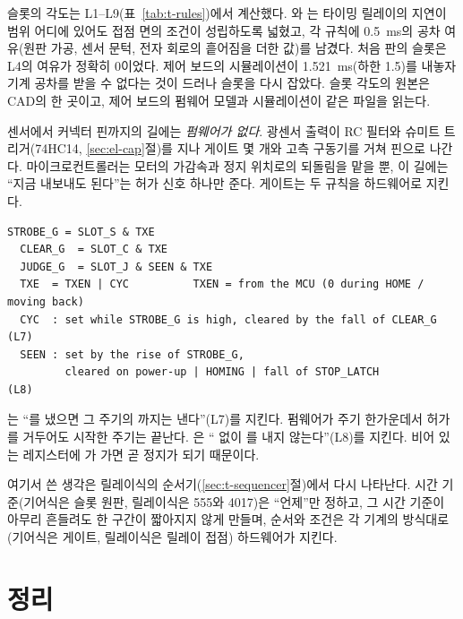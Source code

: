 \Ours 슬롯의 각도는 L1--L9(표~\ref{tab:t-rules})에서 계산했다. 와 는 타이밍 릴레이의 지연이 범위 어디에 있어도
접점 면의 조건이 성립하도록 넓혔고, 각 규칙에 0.5~ms의 공차 여유(원판 가공, 센서 문턱, 전자 회로의 흩어짐을
더한 값)를 남겼다. 처음 판의 슬롯은 L4의 여유가 정확히 0이었다. 제어 보드의 시뮬레이션이 1.521~ms(하한
1.5)를 내놓자 기계 공차를 받을 수 없다는 것이 드러나 슬롯을 다시 잡았다. 슬롯 각도의 원본은 CAD의
 한 곳이고, 제어 보드의 펌웨어 모델과 시뮬레이션이 같은 파일을 읽는다.

센서에서 커넥터 핀까지의 길에는 \emph{펌웨어가 없다}. 광센서 출력이 RC 필터와 슈미트 트리거(74HC14, \ref{sec:el-cap}절)를 지나
게이트 몇 개와 고측 구동기를 거쳐 핀으로 나간다. 마이크로컨트롤러는 모터의 가감속과 정지 위치로의 되돌림을
맡을 뿐, 이 길에는 ``지금 내보내도 된다''는 허가 신호 하나만 준다. 게이트는 두 규칙을 하드웨어로 지킨다.

\begin{lstlisting}[numbers=none,caption={기어식 제어 보드의 타이밍 경로(\code{control-board/README.md} 1.1절).},label={lst:t-gate}]
  STROBE_G = SLOT_S & TXE
  CLEAR_G  = SLOT_C & TXE
  JUDGE_G  = SLOT_J & SEEN & TXE
  TXE  = TXEN | CYC          TXEN = from the MCU (0 during HOME / moving back)
  CYC  : set while STROBE_G is high, cleared by the fall of CLEAR_G        (L7)
  SEEN : set by the rise of STROBE_G,
         cleared on power-up | HOMING | fall of STOP_LATCH                   (L8)
\end{lstlisting}

는 ``를 냈으면 그 주기의 까지는 낸다''(L7)를 지킨다. 펌웨어가 주기 한가운데서
허가를 거두어도 시작한 주기는 끝난다. 은 `` 없이 를 내지 않는다''(L8)를
지킨다. 비어 있는 레지스터에 가 가면 곧 정지가 되기 때문이다.

여기서 쓴 생각은 릴레이식의 순서기(\ref{sec:t-sequencer}절)에서 다시 나타난다. 시간 기준(기어식은 슬롯 원판,
릴레이식은 555와 4017)은 ``언제''만 정하고, 그 시간 기준이 아무리 흔들려도 한 구간이 짧아지지 않게 만들며, 순서와
조건은 각 기계의 방식대로(기어식은 게이트, 릴레이식은 릴레이 접점) 하드웨어가 지킨다.

\section{정리}


